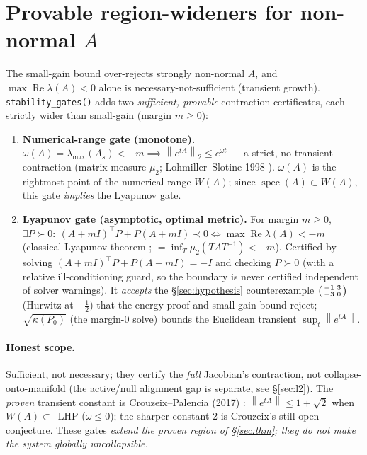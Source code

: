 \documentclass[11pt]{article}
\theoremstyle{definition}
\newcommand{\norm}[1]{\left\lVert#1\right\rVert}
\DeclareMathOperator*{\Real}{Re}
\DeclareMathOperator{\spec}{spec}
\begin{document}
\section{Provable region-wideners for non-normal $A$}
\label{sec:gates}
The small-gain bound over-rejects strongly non-normal $A$, and $\max\Real\lambda(A)<0$
alone is necessary-not-sufficient (transient growth). \texttt{stability\_gates()} adds two
\emph{sufficient, provable} contraction certificates, each strictly wider than small-gain
(margin $m\ge0$):
\begin{enumerate}[leftmargin=1.4em]
\item \textbf{Numerical-range gate (monotone).}
$\omega(A)=\lambda_{\max}(A_s)<-m \implies \norm{e^{tA}}_2\le e^{\omega t}$ --- a strict,
no-transient contraction (matrix measure $\mu_2$; Lohmiller--Slotine 1998
\cite{lohmiller1998}). $\omega(A)$ is the rightmost point of the numerical range $W(A)$;
since $\spec(A)\subset W(A)$, this gate \emph{implies} the Lyapunov gate.
\item \textbf{Lyapunov gate (asymptotic, optimal metric).} For margin $m\ge0$,
$\exists P\succ0:\ (A+mI)^\top P+P(A+mI)\prec0 \iff \max\Real\lambda(A)<-m$ (classical
Lyapunov theorem \cite{khalil2002}; $=\inf_T\mu_2(TAT^{-1})<-m$). Certified by solving
$(A+mI)^\top P+P(A+mI)=-I$ and checking $P\succ0$ (with a relative ill-conditioning guard,
so the boundary is never certified independent of solver warnings). It \emph{accepts} the
\S\ref{sec:hypothesis} counterexample $\begin{psmallmatrix}-1&3\\-3&0\end{psmallmatrix}$
(Hurwitz at $-\tfrac12$) that the energy proof and small-gain bound reject;
$\sqrt{\kappa(P_0)}$ (the margin-$0$ solve) bounds the Euclidean transient
$\sup_t\norm{e^{tA}}$.
\end{enumerate}

\paragraph{Honest scope.} Sufficient, not necessary; they certify the \emph{full}
Jacobian's contraction, not collapse-onto-manifold (the active/null alignment gap is
separate, see \S\ref{sec:l2}). The \emph{proven} transient constant is Crouzeix--Palencia
(2017) \cite{crouzeix2017}: $\norm{e^{tA}}\le 1+\sqrt2$ when $W(A)\subset$~LHP
($\omega\le0$); the sharper constant $2$ is Crouzeix's still-open conjecture. These gates
\emph{extend the proven region of \S\ref{sec:thm}; they do not make the system globally
uncollapsible.}
\end{document}
